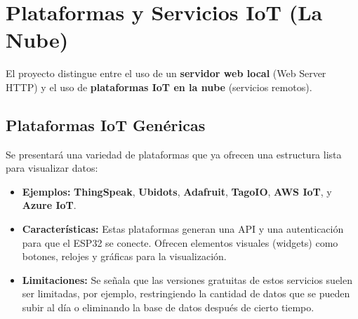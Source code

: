 \documentclass{article}
\begin{document}
\section{Plataformas y Servicios IoT (La Nube)}

El proyecto distingue entre el uso de un \textbf{servidor web local} 
(Web Server HTTP) y el uso de \textbf{plataformas IoT en la nube} 
(servicios remotos).

\subsection{Plataformas IoT Genéricas}
Se presentará una variedad de plataformas que ya ofrecen una estructura 
lista para visualizar datos:
\begin{itemize}
    \item \textbf{Ejemplos:} \textbf{ThingSpeak}, \textbf{Ubidots}, 
    \textbf{Adafruit}, \textbf{TagoIO}, \textbf{AWS IoT}, y 
    \textbf{Azure IoT}.
    \item \textbf{Características:} Estas plataformas generan una API y 
    una autenticación para que el ESP32 se conecte. Ofrecen 
    elementos visuales (widgets) como botones, relojes y gráficas para la 
    visualización.
    \item \textbf{Limitaciones:} Se señala que las versiones gratuitas 
    de estos servicios suelen ser limitadas, por ejemplo, restringiendo 
    la cantidad de datos que se pueden subir al día o eliminando la base 
    de datos después de cierto tiempo.
\end{itemize}
\end{document}
